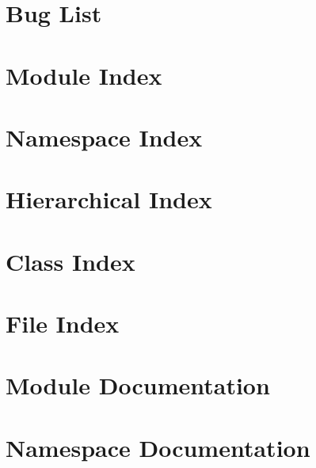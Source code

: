 \documentclass[twoside]{book}
\begin{document}
\chapter{Bug List}
\label{de/da5/bug}
\hypertarget{de/da5/bug}{}

\chapter{Module Index}

\chapter{Namespace Index}

\chapter{Hierarchical Index}

\chapter{Class Index}

\chapter{File Index}

\chapter{Module Documentation}








\chapter{Namespace Documentation}
























\end{document}
